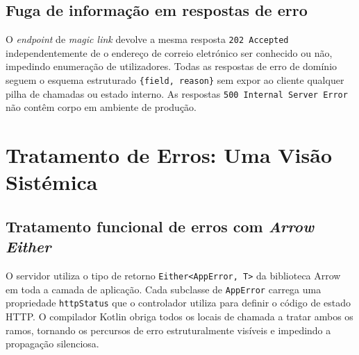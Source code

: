 \subsection*{Fuga de informação em respostas de erro}

O \textit{endpoint} de \textit{magic link} devolve a mesma resposta
\texttt{202 Accepted} independentemente de o endereço de correio eletrónico
ser conhecido ou não, impedindo enumeração de utilizadores.
Todas as respostas de erro de domínio seguem o esquema estruturado
\texttt{\{field, reason\}} sem expor ao cliente qualquer pilha de chamadas
ou estado interno.
As respostas \texttt{500 Internal Server Error} não contêm corpo em
ambiente de produção.

\section{Tratamento de Erros: Uma Visão Sistémica}
\label{sec:tratamento_erros}

\subsection*{Tratamento funcional de erros com \textit{Arrow Either}}

O servidor utiliza o tipo de retorno \texttt{Either<AppError,~T>} da
biblioteca Arrow~\cite{arrow2024} em toda a camada de aplicação.
Cada subclasse de \texttt{AppError} carrega uma propriedade
\texttt{httpStatus} que o controlador utiliza para definir o código de
estado HTTP.
O compilador Kotlin obriga todos os locais de chamada a tratar ambos os
ramos, tornando os percursos de erro estruturalmente visíveis e impedindo
a propagação silenciosa.

